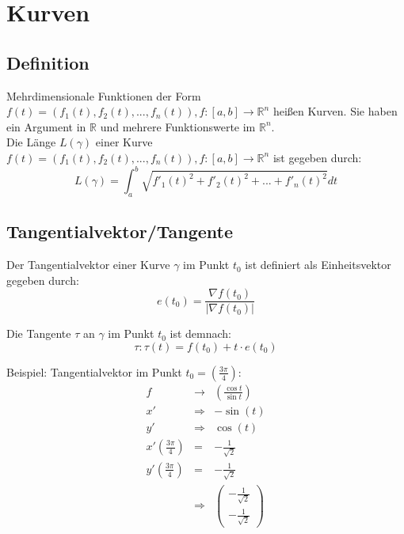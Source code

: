 
\section{Kurven}
\label{sec:kurven}

\subsection{Definition}
\label{sub:definition-kurven}

Mehrdimensionale Funktionen der Form $f(t) = (f_1(t),f_2(t),...,f_n(t)), f:[a,b] \rightarrow \mathbb{R}^n$ heißen Kurven.
Sie haben ein Argument in $\mathbb{R}$ und mehrere Funktionswerte im $\mathbb{R}^n$.
\\
Die Länge $L(\gamma)$ einer Kurve $f(t) = (f_1(t),f_2(t),...,f_n(t)), f:[a,b] \rightarrow \mathbb{R}^n$ ist gegeben durch:
\begin{equation}
	L(\gamma) = \int_a^b \sqrt{f'_1(t)^2 + f'_2(t)^2 + ... + f'_n(t)^2}dt
\end{equation}

\subsection{Tangentialvektor/Tangente}
\label{sub:tangentialvektor_tangente}

Der Tangentialvektor einer Kurve $\gamma$ im Punkt $t_0$ ist definiert als Einheitsvektor gegeben durch: 
\begin{equation}
	e(t_0) = \frac{\nabla f(t_0)}{|\nabla f(t_0)|}
\end{equation}

Die Tangente $\tau$ an $\gamma$ im Punkt $t_0$ ist demnach:
\begin{equation}
	\tau : \tau(t) = f(t_0) +  t \cdot e(t_0)
\end{equation}

Beispiel: Tangentialvektor im Punkt $t_0=\left( \frac{3\pi}{4}\right)$:
\begin{eqnarray*}
	f &\rightarrow& \left( \frac{\cos t}{\sin t} \right)\\
	x' &\Rightarrow& -\sin (t)\\
	y' &\Rightarrow& \cos (t) \\
	x'\left( \frac{3\pi}{4}\right) &=& -\frac{1}{\sqrt{2}}\\
	y'\left( \frac{3\pi}{4}\right) &=& -\frac{1}{\sqrt{2}}\\
	&\Rightarrow& \left(\begin{array}{c} -\frac{1}{\sqrt{2}} \\ -\frac{1}{\sqrt{2}} \end{array}\right)
\end{eqnarray*}


